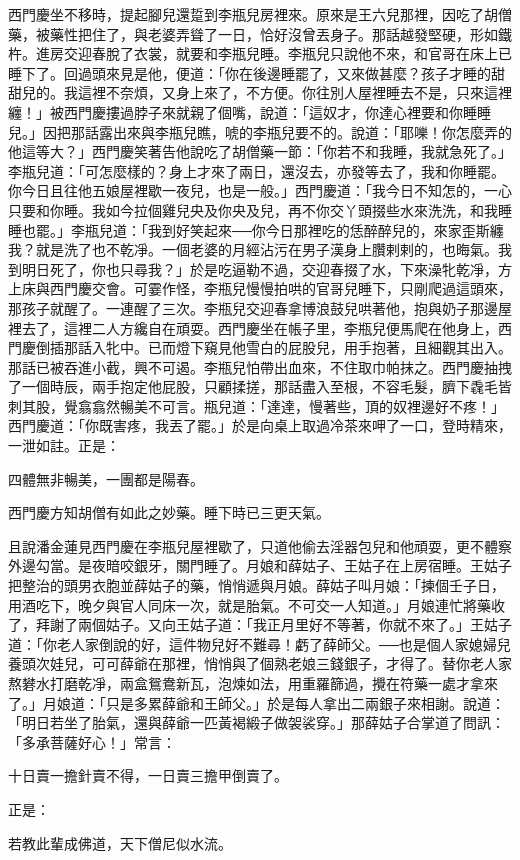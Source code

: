 西門慶坐不移時，提起腳兒還踅到李瓶兒房裡來。原來是王六兒那裡，因吃了胡僧藥，被藥性把住了，與老婆弄聳了一日，恰好沒曾丟身子。那話越發堅硬，形如鐵杵。進房交迎春脫了衣裳，就要和李瓶兒睡。李瓶兒只說他不來，和官哥在床上已睡下了。回過頭來見是他，便道：「你在後邊睡罷了，又來做甚麼？孩子才睡的甜甜兒的。我這裡不奈煩，又身上來了，不方便。你往別人屋裡睡去不是，只來這裡纏！」被西門慶摟過脖子來就親了個嘴，說道：「這奴才，你達心裡要和你睡睡兒。」因把那話露出來與李瓶兒瞧，唬的李瓶兒要不的。說道：「耶嚛！你怎麼弄的他這等大？」西門慶笑著告他說吃了胡僧藥一節：「你若不和我睡，我就急死了。」李瓶兒道：「可怎麼樣的？身上才來了兩日，還沒去，亦發等去了，我和你睡罷。你今日且往他五娘屋裡歇一夜兒，也是一般。」西門慶道：「我今日不知怎的，一心只要和你睡。我如今拉個雞兒央及你央及兒，再不你交丫頭掇些水來洗洗，和我睡睡也罷。」李瓶兒道：「我到好笑起來──你今日那裡吃的恁醉醉兒的，來家歪斯纏我？就是洗了也不乾凈。一個老婆的月經沾污在男子漢身上臢剌剌的，也晦氣。我到明日死了，你也只尋我？」於是吃逼勒不過，交迎春掇了水，下來澡牝乾凈，方上床與西門慶交會。可霎作怪，李瓶兒慢慢拍哄的官哥兒睡下，只剛爬過這頭來，那孩子就醒了。一連醒了三次。李瓶兒交迎春拿博浪鼓兒哄著他，抱與奶子那邊屋裡去了，這裡二人方纔自在頑耍。西門慶坐在帳子里，李瓶兒便馬爬在他身上，西門慶倒插那話入牝中。已而燈下窺見他雪白的屁股兒，用手抱著，且細觀其出入。那話已被吞進小截，興不可遏。李瓶兒怕帶出血來，不住取巾帕抹之。西門慶抽拽了一個時辰，兩手抱定他屁股，只顧揉搓，那話盡入至根，不容毛髮，臍下毳毛皆刺其股，覺翕翕然暢美不可言。瓶兒道：「達達，慢著些，頂的奴裡邊好不疼！」西門慶道：「你既害疼，我丟了罷。」於是向桌上取過冷茶來呷了一口，登時精來，一泄如註。正是：

四體無非暢美，一團都是陽春。

西門慶方知胡僧有如此之妙藥。睡下時已三更天氣。

且說潘金蓮見西門慶在李瓶兒屋裡歇了，只道他偷去淫器包兒和他頑耍，更不體察外邊勾當。是夜暗咬銀牙，關門睡了。月娘和薛姑子、王姑子在上房宿睡。王姑子把整治的頭男衣胞並薛姑子的藥，悄悄遞與月娘。薛姑子叫月娘：「揀個壬子日，用酒吃下，晚夕與官人同床一次，就是胎氣。不可交一人知道。」月娘連忙將藥收了，拜謝了兩個姑子。又向王姑子道：「我正月里好不等著，你就不來了。」王姑子道：「你老人家倒說的好，這件物兒好不難尋！虧了薛師父。──也是個人家媳婦兒養頭次娃兒，可可薛爺在那裡，悄悄與了個熟老娘三錢銀子，才得了。替你老人家熬礬水打磨乾凈，兩盒鴛鴦新瓦，泡煉如法，用重羅篩過，攪在符藥一處才拿來了。」月娘道：「只是多累薛爺和王師父。」於是每人拿出二兩銀子來相謝。說道：「明日若坐了胎氣，還與薛爺一匹黃褐緞子做袈裟穿。」那薛姑子合掌道了問訊：「多承菩薩好心！」常言：

十日賣一擔針賣不得，一日賣三擔甲倒賣了。

正是：

若教此輩成佛道，天下僧尼似水流。

